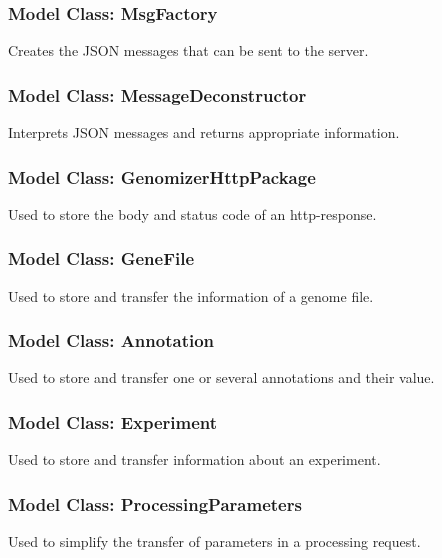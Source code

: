\subsubsection{Model Class: MsgFactory}
Creates the JSON messages that can be sent to the server.
\subsubsection{Model Class: MessageDeconstructor}
Interprets JSON messages and returns appropriate information.
\subsubsection{Model Class: GenomizerHttpPackage}
Used to store the body and status code of an http-response.
\subsubsection{Model Class: GeneFile}
Used to store and transfer the information of a genome file.
\subsubsection{Model Class: Annotation}
Used to store and transfer one or several annotations and their value.
\subsubsection{Model Class: Experiment}
Used to store and transfer information about an experiment.
\subsubsection{Model Class: ProcessingParameters}
Used to simplify the transfer of parameters in a processing request.
